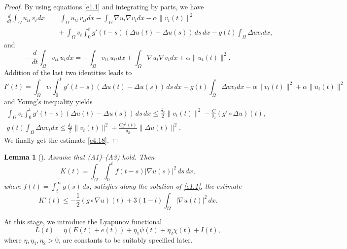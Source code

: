 \documentclass[11pt]{article}
\numberwithin{equation}{section}
\newtheorem{lemma}[theorem]{Lemma}
\begin{document}
\begin{proof}
By using equations \eqref{e1.1} and integrating by parts, we have
\begin{align*}
 \frac{d}{dt}\int_{\Omega} u_{tt} \, v_t dx
& =\int_{\Omega} u_{tt} \, v_{tt} dx -\int_{\Omega} \nabla u_t \nabla v_t dx
 - \alpha \| v_t (t) \|^2 \\
&\quad  +\int_{\Omega} v_t \int_0^t g'(t - s)(\Delta u(t) - \Delta u(s)) \, ds\,dx
- g(t) \int_{\Omega} \Delta u v_t dx,
\end{align*}
and
\begin{equation*}
- \frac{d}{dt}\int_{\Omega} v_{tt} \, u_t dx= -\int_{\Omega} v_{tt} \, u_{tt} dx
+\int_{\Omega} \nabla u_t \nabla v_t dx + \alpha \| u_t (t)\|^2.
\end{equation*}
Addition of the last two identities leads to
\[
I'(t)= \int_{\Omega} v_t \int_0^t g'(t - s)(\Delta u(t)
- \Delta u(s)) \, ds\,dx- g(t) \int_{\Omega} \Delta u v_t dx
 - \alpha \| v_t(t) \|^2 + \alpha \| u_t(t) \|^2
\]
and Young's inequality yields
\begin{gather*}
\int_{\Omega} v_t \int_0^t g'(t - s)(\Delta u(t) - \Delta u(s)) \, ds\,dx
\leq \frac{\delta_2}{2} \| v_t(t) \|^2- \frac{ C}{\delta_2}
(g' \circ \Delta u)(t),
\\
 g(t) \int_{\Omega} \Delta u v_t dx \leq \frac{\delta_2}{2} \| v_t(t) \|^2
 + \frac{Cg^2(t)}{ \delta_2} \| \Delta u (t) \|^2.
\end{gather*}
 We finally get the estimate \eqref{e4.18}.
\end{proof}

\begin{lemma}[\cite{MustafaMuhammadR}] \label{lem10}
 Assume that {\rm (A1)--(A3)}  hold.
Then
\[
 K(t) = \int_{\Omega} \int_0^t f(t - s) |\nabla u(s)|^2 \, ds \, dx,
\]
where $f(t) = \int_{t}^{\infty} g(s) \, ds$, satisfies along the solution
of \eqref{e1.1}, the estimate
\begin{equation}
K'(t) \leq -\frac{1}{2} (g \circ \nabla u)(t)
+ 3(1 - l) \int_{\Omega} |\nabla u(t)|^2 \, dx.   \label{e4.19}
\end{equation}
\end{lemma}

At this stage, we introduce the Lyapunov functional
\begin{equation}
 L(t) = \eta( E(t)+ e(t) )+ \eta_1 \psi(t) + \eta_2 \chi(t)+ I(t), \label{e4.20}
\end{equation}
where $ \eta , \eta_1, \eta_2> 0$, are constants to be suitably specified later.
\end{document}
